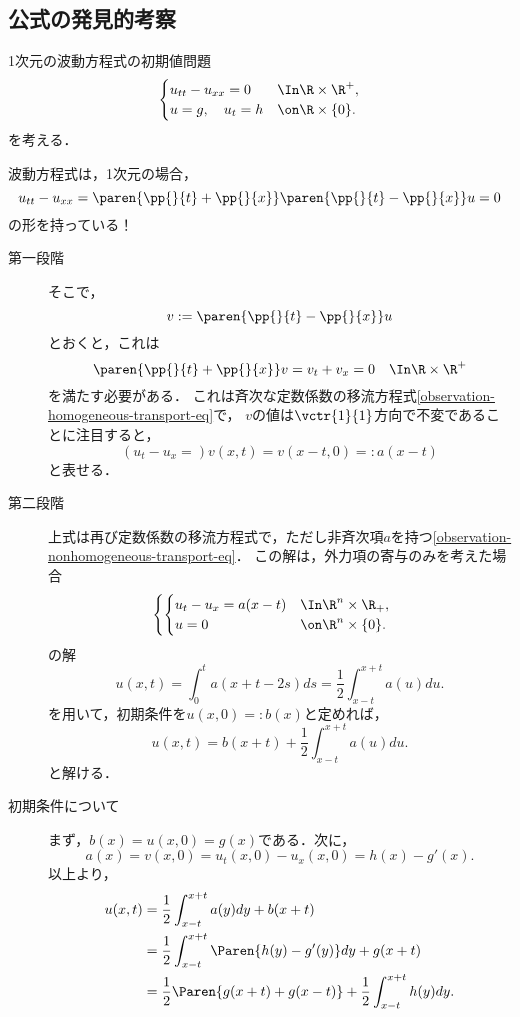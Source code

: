 \documentclass[uplatex,dvipdfmx]{jsreport}
\begin{document}
\subsection{公式の発見的考察}

\begin{problem}
    1次元の波動方程式の初期値問題
    \[\begin{cases}
        u_{tt}-u_{xx}=0&\In \R\times\R^+,\\
        u=g,\quad u_t=h&\on \R\times\{0\}.
    \end{cases}\]
    を考える．
\end{problem}

\begin{observation}
    
    波動方程式は，1次元の場合，
    \[u_{tt}-u_{xx}=\paren{\pp{}{t}+\pp{}{x}}\paren{\pp{}{t}-\pp{}{x}}u=0\]
    の形を持っている！
    \begin{description}
        \item[第一段階] そこで，
        \[v:=\paren{\pp{}{t}-\pp{}{x}}u\]
        とおくと，これは
        \[\paren{\pp{}{t}+\pp{}{x}}v=v_t+v_x=0\quad\In\R\times\R^+\]
        を満たす必要がある．
        これは斉次な定数係数の移流方程式\ref{observation-homogeneous-transport-eq}で，
        $v$の値は$\vctr{1}{1}$方向で不変であることに注目すると，
        \[(u_t-u_x=)v(x,t)=v(x-t,0)=:a(x-t)\]
        と表せる．
        \item[第二段階] 上式は再び定数係数の移流方程式で，ただし非斉次項$a$を持つ\ref{observation-nonhomogeneous-transport-eq}．
        この解は，外力項の寄与のみを考えた場合
        \[\begin{cases}
            \begin{cases}
                u_t-u_x=a(x-t)&\In\R^n\times\R_+,\\
                u=0&\on\R^n\times\{0\}.
            \end{cases}
        \end{cases}\]
        の解
        \[u(x,t)=\int^t_0a(x+t-2s)ds=\frac{1}{2}\int^{x+t}_{x-t}a(u)du.\]
        を用いて，初期条件を$u(x,0)=:b(x)$と定めれば，
        \[u(x,t)=b(x+t)+\frac{1}{2}\int^{x+t}_{x-t}a(u)du.\]
        と解ける．
        \item[初期条件について] まず，$b(x)=u(x,0)=g(x)$である．次に，
        \[a(x)=v(x,0)=u_t(x,0)-u_x(x,0)=h(x)-g'(x).\]
        以上より，
        \begin{align*}
            u(x,t)&=\frac{1}{2}\int^{x+t}_{x-t}a(y)dy+b(x+t)\\
            &=\frac{1}{2}\int^{x+t}_{x-t}\Paren{h(y)-g'(y)}dy+g(x+t)\\
            &=\frac{1}{2}\Paren{g(x+t)+g(x-t)}+\frac{1}{2}\int^{x+t}_{x-t}h(y)dy.
        \end{align*}
    \end{description}
\end{observation}
\end{document}
